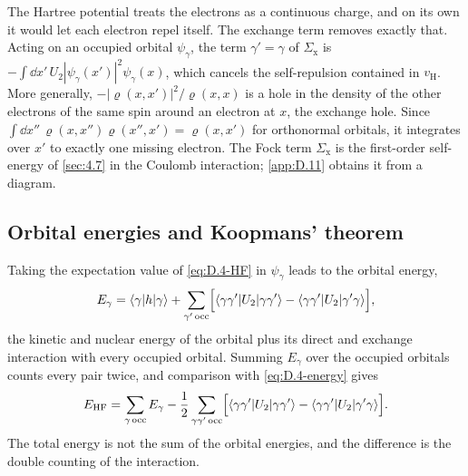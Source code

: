 The Hartree potential treats the electrons as a continuous charge, and on its own it would let each electron repel itself. The exchange term removes exactly that. Acting on an occupied orbital $\psi_\gamma$, the term $\gamma' = \gamma$ of $\Sigma_{\mathrm{x}}$ is $-\int\dd x'\,U_2|\psi_\gamma(x')|^2\psi_\gamma(x)$, which cancels the self-repulsion contained in $v_{\mathrm{H}}$. More generally, $-|\varrho(x, x')|^2/\varrho(x, x)$ is a hole in the density of the other electrons of the same spin around an electron at $x$, the exchange hole. Since $\int\dd x''\,\varrho(x, x'')\varrho(x'', x') = \varrho(x, x')$ for orthonormal orbitals, it integrates over $x'$ to exactly one missing electron. The Fock term $\Sigma_{\mathrm{x}}$ is the first-order self-energy of \cref{sec:4.7} in the Coulomb interaction; \cref{app:D.11} obtains it from a diagram.

\subsection*{Orbital energies and Koopmans' theorem}

Taking the expectation value of \cref{eq:D.4-HF} in $\psi_\gamma$ leads to the orbital energy,
\begin{equation*}
  E_\gamma = \langle\gamma|h|\gamma\rangle + \sum_{\gamma'\,\mathrm{occ}}\Bigl[\langle\gamma\gamma'|U_2|\gamma\gamma'\rangle - \langle\gamma\gamma'|U_2|\gamma'\gamma\rangle\Bigr] ,
\end{equation*}
the kinetic and nuclear energy of the orbital plus its direct and exchange interaction with every occupied orbital. Summing $E_\gamma$ over the occupied orbitals counts every pair twice, and comparison with \cref{eq:D.4-energy} gives
\begin{equation}
  E_{\mathrm{HF}} = \sum_{\gamma\,\mathrm{occ}}E_\gamma - \frac12\sum_{\gamma\gamma'\,\mathrm{occ}}\Bigl[\langle\gamma\gamma'|U_2|\gamma\gamma'\rangle - \langle\gamma\gamma'|U_2|\gamma'\gamma\rangle\Bigr] .
  \label{eq:D.4-Etot}
\end{equation}
The total energy is not the sum of the orbital energies, and the difference is the double counting of the interaction.

